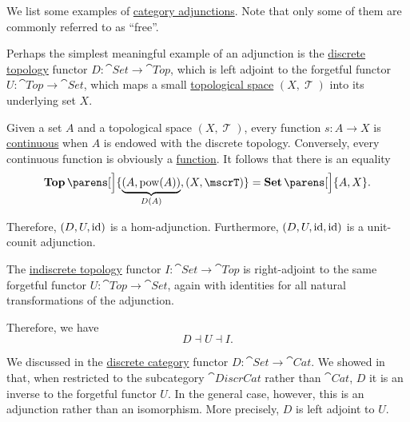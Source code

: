 \begin{example}\label{ex:def:category_adjunction}
  We list some examples of \hyperref[def:category_adjunction]{category adjunctions}. Note that only some of them are commonly referred to as \enquote{free}.

  \begin{thmenum}
     Perhaps the simplest meaningful example of an adjunction is the \hyperref[def:standard_topologies/discrete]{discrete topology} functor \( D: \cat{Set} \to \cat{Top} \), which is left adjoint to the forgetful functor \( U: \cat{Top} \to \cat{Set} \), which maps a small \hyperref[def:topological_space]{topological space} \( (X, \mscrT) \) into its underlying set \( X \).

    Given a set \( A \) and a topological space \( (X, \mscrT) \), every function \( s: A \to X \) is \hyperref[def:global_continuity]{continuous} when \( A \) is endowed with the discrete topology. Conversely, every continuous function is obviously a \hyperref[def:function]{function}. It follows that there is an equality
    \begin{equation*}
      \cat{Top}\parens[\Big]{ \underbrace{(A, \pow(A))}_{D(A)}, (X, \mscrT) } = \cat{Set}\parens[\Big]{ A, X }.
    \end{equation*}

    Therefore, \( (D, U, \operatorname{id}) \) is a hom-adjunction. Furthermore, \( (D, U, \operatorname{id}, \operatorname{id}) \) is a unit-counit adjunction.

     The \hyperref[def:standard_topologies/discrete]{indiscrete topology} functor \( I: \cat{Set} \to \cat{Top} \) is right-adjoint to the same forgetful functor \( U: \cat{Top} \to \cat{Set} \), again with identities for all natural transformations of the adjunction.

    Therefore, we have
    \begin{equation*}
      D \dashv U \dashv I.
    \end{equation*}

     We discussed in  the \hyperref[def:discrete_category]{discrete category} functor \( D: \cat{Set} \to \cat{Cat} \). We showed in  that, when restricted to the subcategory \( \cat{DiscrCat} \) rather than \( \cat{Cat} \), \( D \) it is an inverse to the forgetful functor \( U \). In the general case, however, this is an adjunction rather than an isomorphism. More precisely, \( D \) is left adjoint to \( U \).


\end{thmenum}
\end{example}
